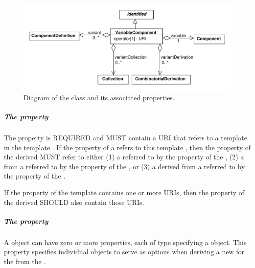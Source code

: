 \begin{figure}[ht]
\begin{center}
\includegraphics[scale=0.6]{uml/variable_component}
\caption[]{Diagram of the  class and its associated properties.}
\label{uml:variable_component}
\end{center}
\end{figure}

\subparagraph{The  property}\label{sec:variable}

The  property is REQUIRED and MUST contain a URI that refers to a template  in the template . If the  property of a  refers to this template , then the  property of the derived  MUST refer to either (1) a  referred to by the  property of the , (2) a  from a  referred to by the  property of the , or (3) a  derived from a  referred to by the  property of the .

If the  property of the template  contains one or more URIs, then the  property of the derived  SHOULD also contain those URIs.

\subparagraph{The  property}\label{sec:variant}

A  object can have zero or more  properties, each of type  specifying a  object. This property specifies individual  objects to serve as options when deriving a new
 for the   from the .


